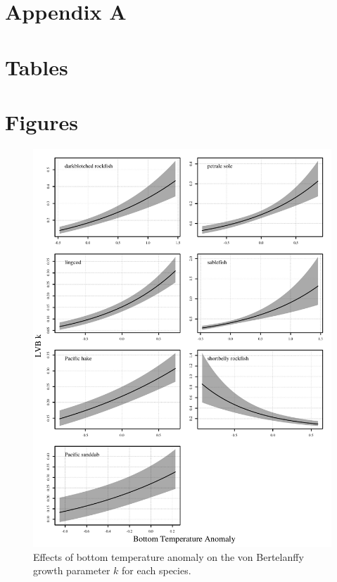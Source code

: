 \documentclass[
]{article}
\begin{document}
\pagebreak

\hypertarget{appendix-a}{%
\section*{Appendix A}\label{appendix-a}}

\hypertarget{tables}{%
\section{Tables}\label{tables}}

\hypertarget{figures}{%
\section{Figures}\label{figures}}

\begin{figure}
\caption{Effects of bottom temperature anomaly on the von Bertelanffy growth parameter $k$ for each species.}\label{temp_effect_k}
\begin{center}
\includegraphics[height = 0.8\textheight]{../results/ss_lvb_temp/temp_effect_by_species.pdf}
\end{center}
\end{figure}
\end{document}
